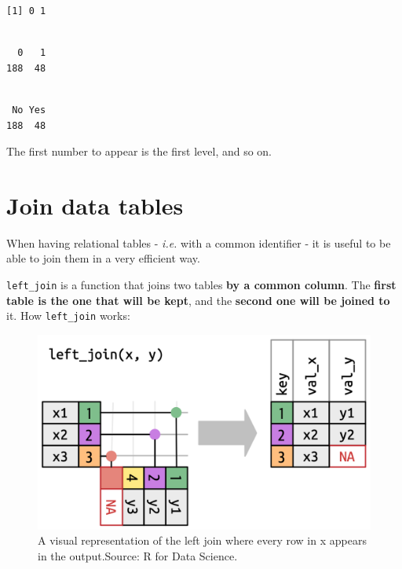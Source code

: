 \documentclass[
  letterpaper,
  DIV=11,
  numbers=noendperiod]{scrreprt}
\newenvironment{Shaded}{\begin{snugshade}}{\end{snugshade}}
\newcommand{\CommentTok}[1]{\textcolor[rgb]{0.37,0.37,0.37}{#1}}
\newcommand{\FunctionTok}[1]{\textcolor[rgb]{0.28,0.35,0.67}{#1}}
\newcommand{\NormalTok}[1]{\textcolor[rgb]{0.00,0.23,0.31}{#1}}
\newcommand{\SpecialCharTok}[1]{\textcolor[rgb]{0.37,0.37,0.37}{#1}}
\begin{document}
\begin{verbatim}
[1] 0 1
\end{verbatim}

\begin{Shaded}
\end{Shaded}

\begin{verbatim}

  0   1 
188  48 
\end{verbatim}

\begin{Shaded}
\end{Shaded}

\begin{verbatim}

 No Yes 
188  48 
\end{verbatim}

The first number to appear is the first level, and so on.

\section{Join data tables}\label{join-data-tables}

When having relational tables - \emph{i.e.} with a common identifier -
it is useful to be able to join them in a very efficient way.

\texttt{left\_join} is a function that joins two tables \textbf{by a
common column}. The \textbf{first table is the one that will be kept},
and the \textbf{second one will be joined to} it. How
\texttt{left\_join} works:

\begin{figure}[H]

{\centering \includegraphics[width=4.41667in,height=\textheight]{images/clipboard-1594422253.png}

}

\caption{A visual representation of the left join where every row in x
appears in the output.Source: R for Data Science.}

\end{figure}%
\end{document}
